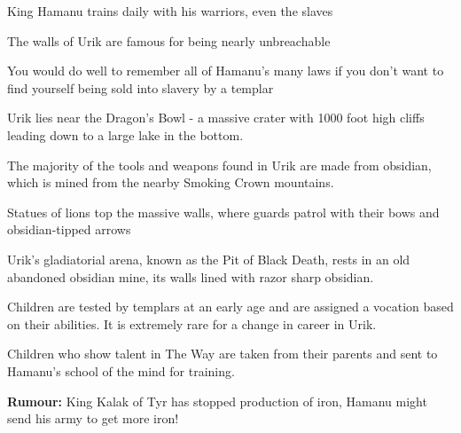 \begin{multicols}{2}
\begin{description}
    \item King Hamanu trains daily with his warriors, even the slaves
    \item The walls of Urik are famous for being nearly unbreachable
    \item You would do well to remember all of Hamanu’s many laws if you don’t want to find yourself being sold into slavery by a templar
    \item Urik lies near the Dragon’s Bowl - a massive crater with 1000 foot high cliffs leading down to a large lake in the bottom.
    \item The majority of the tools and weapons found in Urik are made from obsidian, which is mined from the nearby Smoking Crown mountains.
    \item Statues of lions top the massive walls, where guards patrol with their bows and obsidian-tipped arrows
    \item Urik’s gladiatorial arena, known as the Pit of Black Death, rests in an old abandoned obsidian mine, its walls lined with razor sharp obsidian.
    \item Children are tested by templars at an early age and are assigned a vocation based on their abilities. It is extremely rare for a change in career in Urik.
    \item Children who show talent in The Way are taken from their parents and sent to Hamanu’s school of the mind for training.
    \item \textbf{Rumour:} King Kalak of Tyr has stopped production of iron, Hamanu might send his army to get more iron!
\end{description}

\end{multicols}
